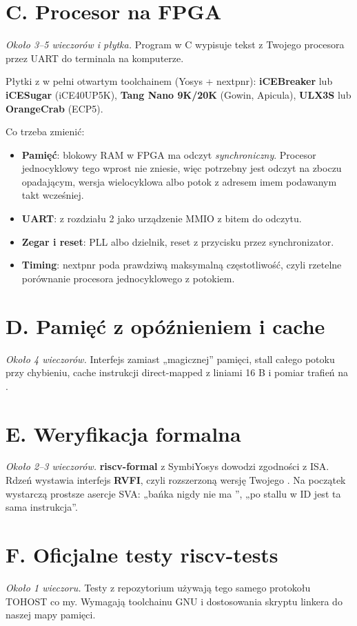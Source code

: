 \section{C. Procesor na FPGA}
\emph{Około 3--5 wieczorów i płytka.} Program w C wypisuje tekst z Twojego procesora
przez UART do terminala na komputerze.

Płytki z w pełni otwartym toolchainem (Yosys + nextpnr): \textbf{iCEBreaker} lub
\textbf{iCESugar} (iCE40UP5K), \textbf{Tang Nano 9K/20K} (Gowin, Apicula),
\textbf{ULX3S} lub \textbf{OrangeCrab} (ECP5).

Co trzeba zmienić:
\begin{itemize}
  \item \textbf{Pamięć}: blokowy RAM w FPGA ma odczyt \emph{synchroniczny}. Procesor
    jednocyklowy tego wprost nie zniesie, więc potrzebny jest odczyt na zboczu
    opadającym, wersja wielocyklowa albo potok z adresem imem podawanym takt
    wcześniej.
  \item \textbf{UART}:  z rozdziału 2 jako urządzenie MMIO z bitem
     do odczytu.
  \item \textbf{Zegar i reset}: PLL albo dzielnik, reset z przycisku przez
    synchronizator.
  \item \textbf{Timing}: nextpnr poda prawdziwą maksymalną częstotliwość, czyli
    rzetelne porównanie procesora jednocyklowego z potokiem.
\end{itemize}

\section{D. Pamięć z opóźnieniem i cache}
\emph{Około 4 wieczorów.} Interfejs  zamiast „magicznej”
pamięci, stall całego potoku przy chybieniu, cache instrukcji direct-mapped z
liniami 16 B i pomiar trafień na .

\section{E. Weryfikacja formalna}
\emph{Około 2--3 wieczorów.} \textbf{riscv-formal} z SymbiYosys dowodzi zgodności z
ISA. Rdzeń wystawia interfejs \textbf{RVFI}, czyli rozszerzoną wersję Twojego
. Na początek wystarczą prostsze asercje SVA: „bańka nigdy nie ma
”, „po stallu w ID jest ta sama instrukcja”.

\section{F. Oficjalne testy riscv-tests}
\emph{Około 1 wieczoru.} Testy  z repozytorium
 używają tego samego protokołu TOHOST co my.
Wymagają toolchainu GNU i dostosowania skryptu linkera do naszej mapy pamięci.

